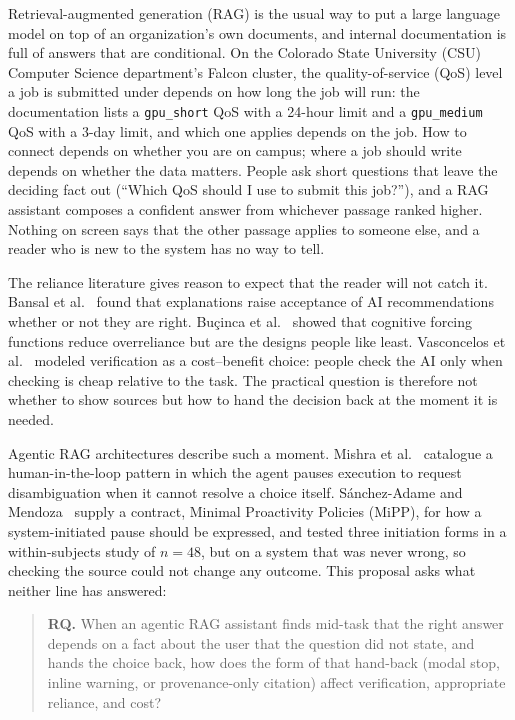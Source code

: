 \documentclass[sigconf,nonacm]{acmart}
\begin{document}
Retrieval-augmented generation (RAG) is the usual way to put a large
language model on top of an organization's own documents, and internal
documentation is full of answers that are conditional. On the Colorado
State University (CSU) Computer Science department's Falcon cluster, the
quality-of-service (QoS) level a job is submitted under depends on how long
the job will run: the documentation lists a \texttt{gpu\_short} QoS with a
24-hour limit and a \texttt{gpu\_medium} QoS with a 3-day limit, and which
one applies depends on the job.
How to connect depends on whether you are on campus; where a job should
write depends on whether the data matters. People ask short questions that
leave the deciding fact out (``Which QoS should I use to submit this
job?''), and a RAG assistant composes a confident answer from whichever
passage ranked higher. Nothing on screen says that the other passage
applies to someone else, and a reader who is new to the system has no way
to tell.

The reliance literature gives reason to expect that the reader will not
catch it. Bansal et al.~\cite{bansal2021} found that explanations raise
acceptance of AI recommendations whether or not they are right.
Bu\c{c}inca et al.~\cite{bucinca2021} showed that cognitive forcing
functions reduce overreliance but are the designs people like least.
Vasconcelos et al.~\cite{vasconcelos2023} modeled verification as a
cost--benefit choice: people check the AI only when checking is cheap
relative to the task. The practical question is therefore not whether to
show sources but how to hand the decision back at the moment it is needed.

Agentic RAG architectures describe such a moment. Mishra et
al.~\cite{mishra2026} catalogue a human-in-the-loop pattern in which the
agent pauses execution to request disambiguation when it cannot resolve a
choice itself. S\'anchez-Adame and Mendoza~\cite{sanchezadame2026} supply
a contract, Minimal Proactivity Policies (MiPP), for how a system-initiated
pause should be expressed, and tested three initiation forms in a
within-subjects study of $n{=}48$, but on a system that was never wrong,
so checking the source could not change any outcome. This proposal asks
what neither line has answered:

\begin{quote}
\textbf{RQ.} When an agentic RAG assistant finds mid-task that the right
answer depends on a fact about the user that the question did not state,
and hands the choice back, how does the form of that hand-back (modal
stop, inline warning, or provenance-only citation) affect verification,
appropriate reliance, and cost?
\end{quote}
\end{document}
